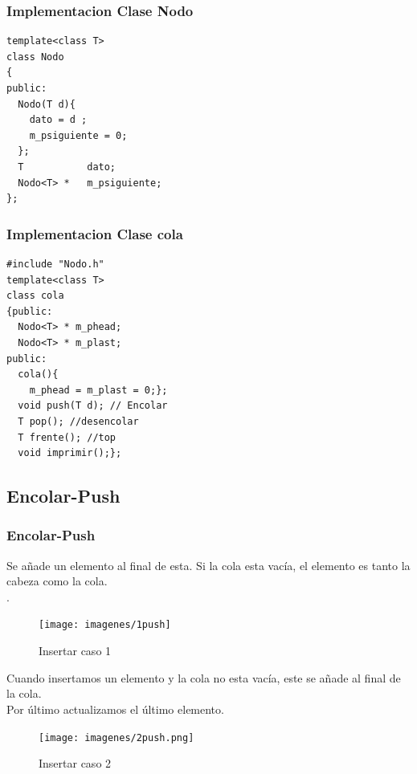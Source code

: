 \documentclass{beamer}
\begin{document}
\begin{frame}[fragile]
\frametitle{Implementacion Clase Nodo}
\begin{verbatim}
template<class T>
class Nodo
{
public:
  Nodo(T d){
    dato = d ;
    m_psiguiente = 0;
  };  
  T           dato;
  Nodo<T> *   m_psiguiente;
};
\end{verbatim}
\end{frame}


\begin{frame}[fragile]
\frametitle{Implementacion Clase cola}
\begin{verbatim}
#include "Nodo.h"
template<class T>
class cola
{public:
  Nodo<T> * m_phead;
  Nodo<T> * m_plast;
public:
  cola(){
    m_phead = m_plast = 0;};
  void push(T d); // Encolar
  T pop(); //desencolar
  T frente(); //top
  void imprimir();};
\end{verbatim}
\end{frame}




 \subsection{Encolar-Push}
    \begin{frame}
      \frametitle{Encolar-Push}
      Se añade un elemento al final de esta. Si la cola esta vacía, el elemento es tanto la cabeza como la cola.\\
      .\\
      
      \begin{figure}
    \texttt{[image: imagenes/1push]}
    \caption{Insertar caso 1}
    \end{figure}
    \end{frame}
    
    \begin{frame}
	Cuando insertamos un elemento y la cola no esta vacía, este se añade al final de la cola.\\
	Por último actualizamos el último elemento.\\
    
    \begin{figure}
	\texttt{[image: imagenes/2push.png]}
      \caption{Insertar caso 2}
      \end{figure}
   
   \end{frame}
\end{document}
